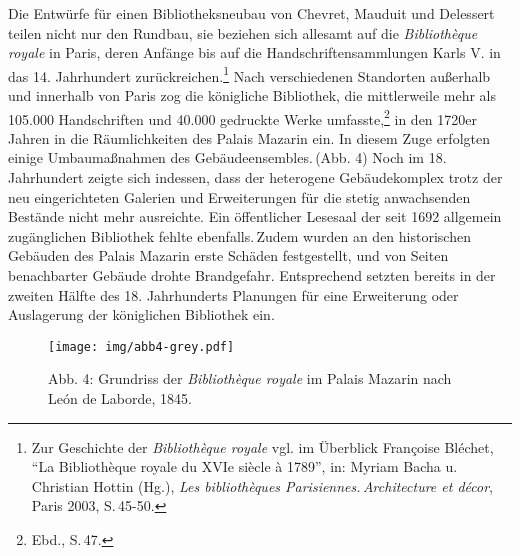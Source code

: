 Die Entwürfe für einen Bibliotheksneubau von Chevret, Mauduit und
Delessert teilen nicht nur den Rundbau, sie beziehen sich allesamt auf
die \emph{Bibliothèque royale} in Paris, deren Anfänge bis auf die
Handschriftensammlungen Karls V. in das 14. Jahrhundert
zurückreichen.\footnote{Zur Geschichte der \emph{Bibliothèque royale}
  vgl. im Überblick Françoise Bléchet, \enquote{La Bibliothèque royale
  du XVIe siècle à 1789}, in: Myriam Bacha u. Christian Hottin (Hg.),
  \emph{Les bibliothèques Parisiennes.\,Architecture et décor}, Paris
  2003, S.\,45-50.} Nach verschiedenen Standorten außerhalb und innerhalb
von Paris zog die königliche Bibliothek, die mittlerweile mehr als
105.000 Handschriften und 40.000 gedruckte Werke umfasste,\footnote{Ebd.,
  S.\,47.} in den 1720er Jahren in die Räumlichkeiten des Palais Mazarin
ein. In diesem Zuge erfolgten einige Umbaumaßnahmen des
Gebäudeensembles.\,(Abb. 4) Noch im 18. Jahrhundert zeigte sich indessen,
dass der heterogene Gebäudekomplex trotz der neu eingerichteten Galerien
und Erweiterungen für die stetig anwachsenden Bestände nicht mehr
ausreichte. Ein öffentlicher Lesesaal der seit 1692 allgemein
zugänglichen Bibliothek fehlte ebenfalls.\,Zudem wurden an den
historischen Gebäuden des Palais Mazarin erste Schäden festgestellt, und
von Seiten benachbarter Gebäude drohte Brandgefahr. Entsprechend setzten
bereits in der zweiten Hälfte des 18. Jahrhunderts Planungen für eine
Erweiterung oder Auslagerung der königlichen Bibliothek ein.

\begin{figure}[htbp]
\centering
\texttt{[image: img/abb4-grey.pdf]}
\caption*{Abb. 4: Grundriss der \emph{Bibliothèque royale} im Palais
Mazarin nach León de Laborde, 1845.}
\end{figure}

